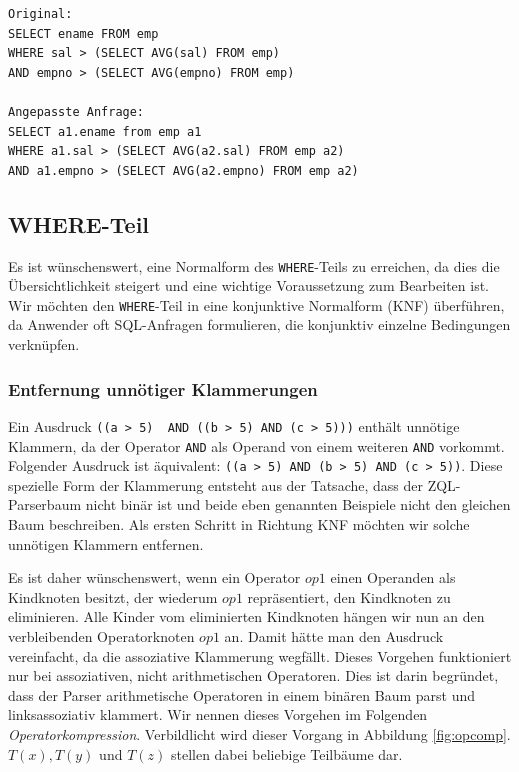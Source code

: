 \begin{verbatim}
Original:
SELECT ename FROM emp 
WHERE sal > (SELECT AVG(sal) FROM emp) 
AND empno > (SELECT AVG(empno) FROM emp)

Angepasste Anfrage:
SELECT a1.ename from emp a1 
WHERE a1.sal > (SELECT AVG(a2.sal) FROM emp a2)
AND a1.empno > (SELECT AVG(a2.empno) FROM emp a2)
\end{verbatim}

\subsection{WHERE-Teil}
\label{subsec:where}

Es ist wünschenswert, eine Normalform des \verb|WHERE|-Teils zu erreichen, da dies die Übersichtlichkeit steigert und eine wichtige Voraussetzung zum Bearbeiten ist. Wir möchten den \verb|WHERE|-Teil in eine konjunktive Normalform (KNF) überführen, da Anwender oft SQL-Anfragen formulieren, die konjunktiv einzelne Bedingungen verknüpfen. 

\subsubsection{Entfernung unnötiger Klammerungen}
\label{subsubsec:opcomp}

Ein Ausdruck \verb|((a > 5)  AND ((b > 5) AND (c > 5)))| enthält unnötige Klammern, da der Operator \verb|AND| als Operand von einem weiteren \verb|AND| vorkommt. Folgender Ausdruck ist äquivalent: \verb|((a > 5) AND (b > 5) AND (c > 5))|. Diese spezielle Form der Klammerung entsteht aus der Tatsache, dass der ZQL-Parserbaum nicht binär ist und beide eben genannten Beispiele nicht den gleichen Baum beschreiben. Als ersten Schritt in Richtung KNF möchten wir solche unnötigen Klammern entfernen. 

Es ist daher wünschenswert, wenn ein Operator $op1$ einen Operanden als Kindknoten besitzt, der wiederum $op1$ repräsentiert, den Kindknoten zu eliminieren. Alle Kinder vom eliminierten Kindknoten hängen wir nun an den verbleibenden Operatorknoten $op1$ an. Damit hätte man den Ausdruck vereinfacht, da die assoziative Klammerung wegfällt. Dieses Vorgehen funktioniert nur bei assoziativen, nicht arithmetischen Operatoren. Dies ist darin begründet, dass der Parser arithmetische Operatoren in einem binären Baum parst und linksassoziativ klammert. Wir nennen dieses Vorgehen im Folgenden \textit{Operatorkompression}. Verbildlicht wird dieser Vorgang in Abbildung \ref{fig:opcomp}. $T(x), T(y)$ und $T(z)$ stellen dabei beliebige Teilbäume dar.

